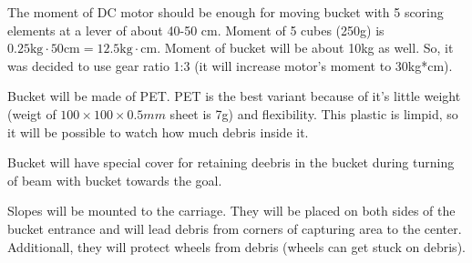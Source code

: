 \begin{enumerate*}
  	The moment of DC motor should be enough for moving bucket with 5 scoring elements at a lever of about 40-50 cm. Moment of 5 cubes (250g) is $0.25\text{kg} \cdot 50\text{cm} = 12.5\text{kg} \cdot \text{cm}$. Moment of bucket will be about 10kg as well. So, it was decided to use gear ratio 1:3 (it will increase motor's moment to 30kg*cm).
  	\item Bucket will be made of PET. PET is the best variant because of it's little weight (weigt of $100\times 100 \times 0.5mm$ sheet is 7g) and flexibility. This plastic is limpid, so it will be possible to watch how much debris inside it.
  	
  	Bucket will have special cover for retaining deebris in the bucket during turning of beam with bucket towards the goal.
  	\begin{figure}[H]
  		\begin{minipage}[h]{1\linewidth}
  		  \caption{}
  		\end{minipage}
  	\end{figure}
  	\item Slopes will be mounted to the carriage. They will be placed on both sides of the bucket entrance and will lead debris from corners of capturing area to the center. Additionall, they will protect wheels from debris (wheels can get stuck on debris).
  	\begin{figure}[H]
  		\begin{minipage}[h]{1\linewidth}
  		  \caption{}
  		\end{minipage}
  	\end{figure}
  	

\end{enumerate*}
